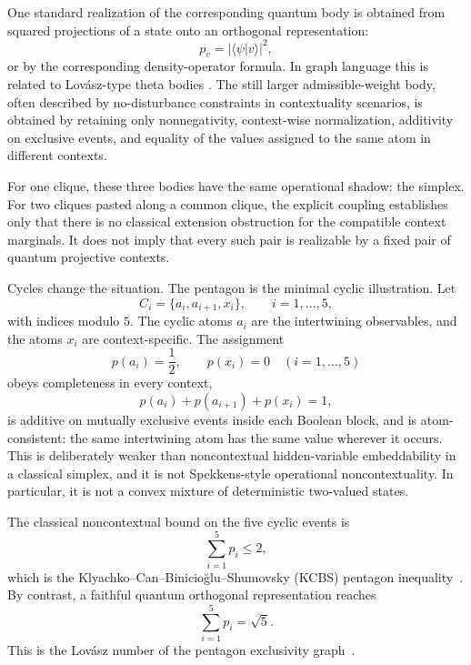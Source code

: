 \documentclass[aps,pra,reprint,superscriptaddress,nofootinbib,floatfix]{revtex4-2}
\begin{document}
One standard realization of the corresponding quantum body is obtained from
squared projections of a state onto an orthogonal representation:
\begin{equation}
        p_v=|\langle\psi|v\rangle|^2,
\end{equation}
or by the corresponding density-operator formula.  In graph language this is
related to Lov\'asz-type theta bodies
\cite{Lovasz1975,GroetschelLovaszSchrijver1986,cabello-severini-winter-2014}.
The still larger admissible-weight body, often described by no-disturbance
constraints in contextuality scenarios, is obtained by retaining only
nonnegativity, context-wise normalization, additivity on exclusive events,
and equality of the values assigned to the same atom in different contexts.

For one clique, these three bodies have the same operational shadow: the
simplex.  For two cliques pasted along a common clique, the explicit coupling
establishes only that there is no classical extension obstruction for the
compatible context marginals.  It does not imply that every such pair is
realizable by a fixed pair of quantum projective contexts.

Cycles change the situation.  The pentagon is the minimal cyclic illustration.
Let
\[
        C_i=\{a_i,a_{i+1},x_i\},\qquad i=1,\ldots,5,
\]
with indices modulo \(5\).  The cyclic atoms \(a_i\) are the intertwining
observables, and the atoms \(x_i\) are context-specific.  The assignment
\begin{equation}
        p(a_i)=\frac12,\qquad p(x_i)=0
        \quad (i=1,\ldots,5)
        \label{eq:pentagon-half-weight}
\end{equation}
obeys completeness in every context,
\[
        p(a_i)+p(a_{i+1})+p(x_i)=1,
\]
is additive on mutually exclusive events inside each Boolean block, and is
atom-consistent: the same intertwining atom has the same value wherever it
occurs.  This is deliberately weaker than noncontextual hidden-variable
embeddability in a classical simplex, and it is not Spekkens-style
operational noncontextuality.  In particular, it is not a convex mixture of
deterministic two-valued states.

The classical noncontextual bound on the five cyclic events is
\begin{equation}
        \sum_{i=1}^5 p_i\le 2,
\end{equation}
which is the Klyachko--Can--Binicio\u{g}lu--Shumovsky (KCBS) pentagon
inequality~\cite{Klyachko-2008,Badziag-2011,Bub-2009}.  By contrast, a
faithful quantum orthogonal representation reaches
\begin{equation}
        \sum_{i=1}^5 p_i=\sqrt{5}.
\end{equation}
This is the Lov\'asz number of the pentagon exclusivity
graph~\cite{lovasz-79,cabello-severini-winter-2014}.
\end{document}
